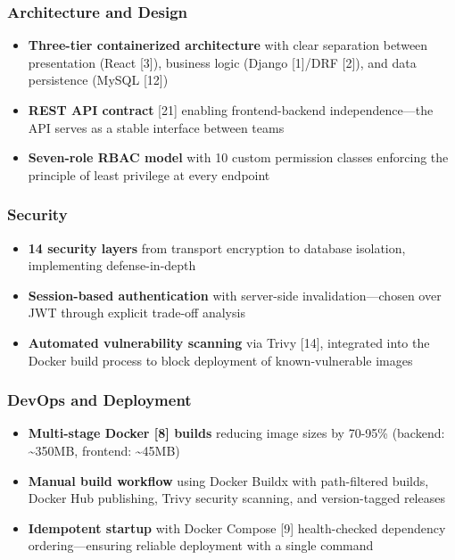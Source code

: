 \subsubsection{Architecture and Design}
\begin{itemize}
    \item \textbf{Three-tier containerized architecture} with clear separation between presentation (React [3]), business logic (Django [1]/DRF [2]), and data persistence (MySQL [12])
    \item \textbf{REST API contract} [21] enabling frontend-backend independence---the API serves as a stable interface between teams
    \item \textbf{Seven-role RBAC model} with 10 custom permission classes enforcing the principle of least privilege at every endpoint
\end{itemize}

\subsubsection{Security}
\begin{itemize}
    \item \textbf{14 security layers} from transport encryption to database isolation, implementing defense-in-depth
    \item \textbf{Session-based authentication} with server-side invalidation---chosen over JWT through explicit trade-off analysis
    \item \textbf{Automated vulnerability scanning} via Trivy [14], integrated into the Docker build process to block deployment of known-vulnerable images
\end{itemize}

\subsubsection{DevOps and Deployment}
\begin{itemize}
    \item \textbf{Multi-stage Docker [8] builds} reducing image sizes by 70-95\% (backend: \textasciitilde350MB, frontend: \textasciitilde45MB)
    \item \textbf{Manual build workflow} using Docker Buildx with path-filtered builds, Docker Hub publishing, Trivy security scanning, and version-tagged releases
    \item \textbf{Idempotent startup} with Docker Compose [9] health-checked dependency ordering---ensuring reliable deployment with a single command
\end{itemize}

